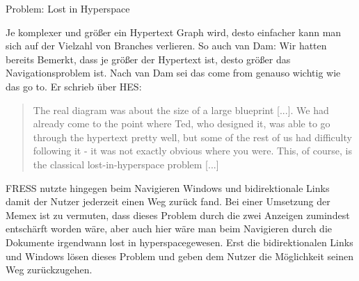 \begin{section}{Problem: Lost in Hyperspace}
\label{sec:lostInHyperspace}

Je komplexer und größer ein Hypertext Graph wird, desto einfacher kann man sich auf der Vielzahl von Branches verlieren. So auch van Dam: \glqq Wir hatten bereits Bemerkt, dass je größer der Hypertext ist, desto größer das Navigationsproblem ist\grqq{ }\cite{Dam1988}. Nach van Dam sei das \glqq come from\grqq{ } genauso wichtig wie das \glqq go to\grqq{ }\cite{Dam1988}. Er schrieb über HES:

\begin{quote}
\glqq [...] The real diagram was about the size of a large blueprint [...]. We had already come to the point where Ted, who designed it, was able to go through the hypertext pretty well, but some of the rest of us had difficulty following it - it was not exactly obvious where you were. This, of course, is the classical lost-in-hyperspace problem [...]\grqq{ }\cite{Dam1988}
\end{quote}

FRESS nutzte hingegen beim Navigieren Windows und bidirektionale Links damit der Nutzer jederzeit einen Weg zurück fand. Bei einer Umsetzung der Memex ist zu vermuten, dass dieses Problem durch die zwei Anzeigen zumindest entschärft worden wäre, aber auch hier wäre man beim Navigieren durch die Dokumente irgendwann \glqq lost in hyperspace\grqq gewesen. Erst die bidirektionalen Links und Windows lösen dieses Problem und geben dem Nutzer die Möglichkeit seinen Weg zurückzugehen.

\end{section}

